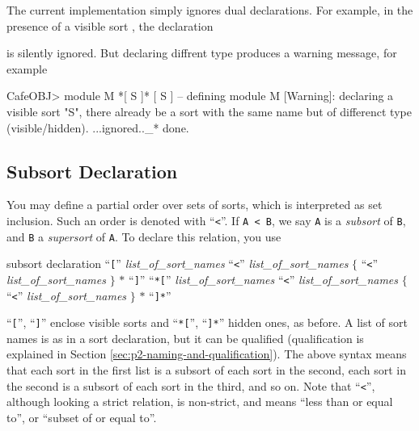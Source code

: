 \documentclass[a4paper]{memoir}
\begin{document}
\begin{warning}
  The current implementation simply ignores dual declarations.
  For example, in the presence of a visible sort , the
  declaration
  \begin{ccode}
    [ S ]
  \end{ccode}
  is silently ignored. But declaring diffrent type produces
  a warning message, for example
  \begin{snugshade}
  \begin{ccode}
    CafeOBJ> module M { *[ S ]* [ S ] }
    -- defining module M
    [Warning]: declaring a visible sort "S", there already be a sort
        with the same name but of differenct type (visible/hidden).
        ...ignored.._* done.
  \end{ccode}
\end{snugshade}
\end{warning}

\subsection{Subsort Declaration}

You may define a partial order over sets of sorts, which is
interpreted as set inclusion.
Such an order is denoted with ``\verb|<|''. If \verb|A < B|,
we say \verb|A| is a {\em subsort} of \verb|B|,
and \verb|B| a {\em supersort}
of \verb|A|. To declare this relation, you use

\begin{bsyntax} subsort declaration \index{\texttt{<}} \Hline
``\texttt{[}'' \textit{list\_of\_sort\_names} ``\texttt{<}'' \textit{list\_of\_sort\_names} $\{$ ``\texttt{<}'' \textit{list\_of\_sort\_names} $\}$ $*$ ``\texttt{]}''
``\texttt{*[}'' \textit{list\_of\_sort\_names} ``\texttt{<}'' \textit{list\_of\_sort\_names} $\{$ ``\texttt{<}'' \textit{list\_of\_sort\_names} $\}$ $*$ ``\texttt{]*}''
\end{bsyntax}

``\verb|[|'', ``\verb|]|'' enclose visible sorts and ``\verb|*[|'',
``\verb|]*|'' hidden ones, as before.
A list of sort names is as in a sort declaration, but it can be
qualified (qualification is explained in Section
\ref{sec:p2-naming-and-qualification}). The above syntax means
that each sort in the first list is a subsort of each sort in the
second, each sort in the second is a subsort of each sort in
the third, and so on. Note that ``\verb|<|'', although looking a
strict relation, is non-strict, and means ``less than or equal to'', or
``subset of or equal to''.
\end{document}
